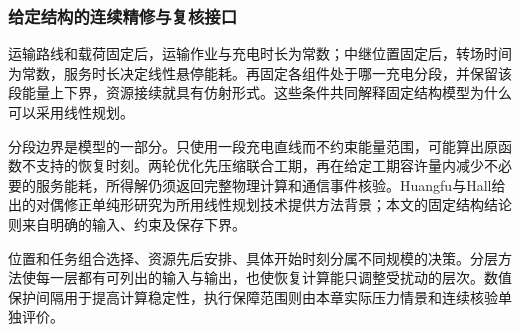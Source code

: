 \subsubsection{给定结构的连续精修与复核接口}
运输路线和载荷固定后，运输作业与充电时长为常数；中继位置固定后，转场时间为常数，服务时长决定线性悬停能耗。再固定各组件处于哪一充电分段，并保留该段能量上下界，资源接续就具有仿射形式。这些条件共同解释固定结构模型为什么可以采用线性规划。

分段边界是模型的一部分。只使用一段充电直线而不约束能量范围，可能算出原函数不支持的恢复时刻。两轮优化先压缩联合工期，再在给定工期容许量内减少不必要的服务能耗，所得解仍须返回完整物理计算和通信事件核验。Huangfu与Hall给出的对偶修正单纯形研究为所用线性规划技术提供方法背景\cite{huangfu2018}；本文的固定结构结论则来自明确的输入、约束及保存下界。

位置和任务组合选择、资源先后安排、具体开始时刻分属不同规模的决策。分层方法使每一层都有可列出的输入与输出，也使恢复计算能只调整受扰动的层次。数值保护间隔用于提高计算稳定性，执行保障范围则由本章实际压力情景和连续核验单独评价。
